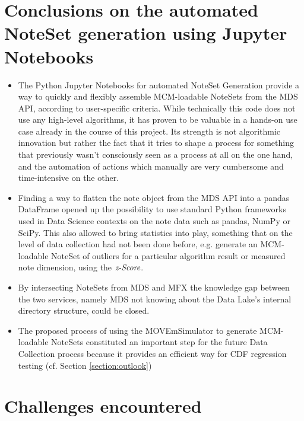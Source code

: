 \section{Conclusions on the automated NoteSet generation using Jupyter Notebooks}

\begin{itemize}
	\item The Python Jupyter Notebooks for automated NoteSet Generation provide a way to quickly and flexibly assemble MCM-loadable NoteSets from the MDS API, according to user-specific criteria. While technically this code does not use any high-level algorithms, it has proven to be valuable in a hands-on use case already in the course of this project. Its strength is not algorithmic innovation but rather the fact that it tries to shape a process for something that previously wasn't consciously seen as a process at all on the one hand, and the automation of actions which manually are very cumbersome and time-intensive on the other.
	\item Finding a way to flatten the note object from the MDS API into a pandas DataFrame opened up the possibility to use standard Python frameworks used in Data Science contexts on the note data such as pandas, NumPy or SciPy. This also allowed to bring statistics into play, something that on the level of data collection had not been done before, e.g. generate an MCM-loadable NoteSet of outliers for a particular algorithm result or measured note dimension, using the $\emph{z-Score}$.
	\item By intersecting NoteSets from MDS and MFX the knowledge gap between the two services, namely MDS not knowing about the Data Lake's internal directory structure, could be closed.
	\item The proposed process of using the MOVEmSimulator to generate MCM-loadable NoteSets constituted an important step for the future Data Collection process because it provides an efficient way for CDF regression testing (cf. Section \ref{section:outlook})
\end{itemize}

\section{Challenges encountered}

